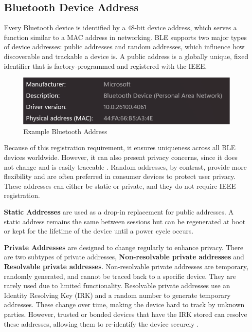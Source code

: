 \subsection{Bluetooth Device Address}

Every Bluetooth device is identified by a 48-bit device address, which serves a function similar to a MAC address in networking. BLE supports two major types of device addresses: public addresses and random addresses, which influence how discoverable and trackable a device is.
A public address is a globally unique, fixed identifier that is factory-programmed and registered with the IEEE. 

\begin{figure}[H]
    \centering
    \includegraphics[width=0.5\linewidth]{bluetoothaddress.png}
    \caption{Example Bluetooth Address}
    \label{fig:bluetoothaddress}
\end{figure}

Because of this registration requirement, it ensures uniqueness across all BLE devices worldwide. However, it can also present privacy concerns, since it does not change and is easily traceable \cite{introtoble}.
Random addresses, by contrast, provide more flexibility and are often preferred in consumer devices to protect user privacy. These addresses can either be static or private, and they do not require IEEE registration.

\textbf{Static Addresses} are used as a drop-in replacement for public addresses. A static address remains the same between sessions but can be regenerated at boot or kept for the lifetime of the device until a power cycle occurs.

\textbf{Private Addresses} are designed to change regularly to enhance privacy. There are two subtypes of private addresses, \textbf{Non-resolvable private addresses} and \textbf{Resolvable private addresses}. Non-resolvable private addresses are temporary, randomly generated, and cannot be traced back to a specific device. They are rarely used due to limited functionality. Resolvable private addresses use an Identity Resolving Key (IRK) and a random number to generate temporary addresses. These change over time, making the device hard to track by unknown parties. However, trusted or bonded devices that have the IRK stored can resolve these addresses, allowing them to re-identify the device securely \cite{introtoble}.

